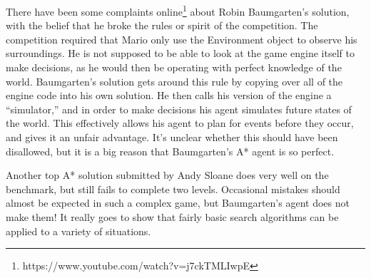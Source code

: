 \documentclass[12pt]{article}
\begin{document}
\begin{multicols*}{2}
There have been some complaints online\footnote{
https://www.youtube.com/watch?v=j7ckTMLIwpE} 
about Robin Baumgarten's solution, with the belief that 
he broke the rules or spirit of the competition.  The competition required that Mario only use the 
Environment object to observe his surroundings.  He is not supposed to be able to look at the game 
engine itself to make decisions, as he would then be operating with perfect knowledge of the world.  
Baumgarten's solution gets around this rule by copying over all of the engine code into his own 
solution.  He then calls his version of the engine a ``simulator,'' and in order to make decisions 
his agent simulates future states of the world.  This effectively allows his agent to plan for events 
before they occur, and gives it an unfair advantage.  It's unclear whether this should have been 
disallowed, but it is a big reason that Baumgarten's A* agent is so perfect.

Another  top A* solution submitted by Andy Sloane does very well on the benchmark, 
but still fails to complete 
two levels.  Occasional mistakes should almost be expected in such a complex game, but 
Baumgarten's agent does not make them!  It really goes to show that fairly basic search algorithms 
can be applied to a variety of situations.

\end{multicols*}
\end{document}
